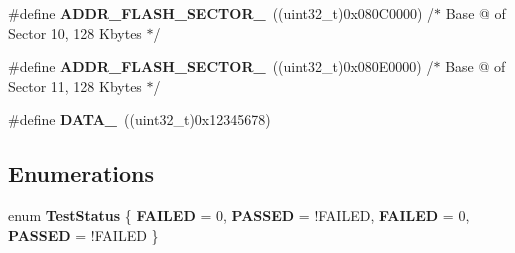 \begin{DoxyCompactItemize}
\item 
\hypertarget{group___f_l_a_s_h___program_ga3cea1f00ae802317e67815c9dedc62b7}{\#define {\bfseries A\-D\-D\-R\-\_\-\-F\-L\-A\-S\-H\-\_\-\-S\-E\-C\-T\-O\-R\-\_}~((uint32\-\_\-t)0x080\-C0000) /$\ast$ Base @ of Sector 10, 128 Kbytes $\ast$/}\label{group___f_l_a_s_h___program_ga3cea1f00ae802317e67815c9dedc62b7}

\item 
\hypertarget{group___f_l_a_s_h___program_ga7b945836a10e9782cbb63338f271f2aa}{\#define {\bfseries A\-D\-D\-R\-\_\-\-F\-L\-A\-S\-H\-\_\-\-S\-E\-C\-T\-O\-R\-\_}~((uint32\-\_\-t)0x080\-E0000) /$\ast$ Base @ of Sector 11, 128 Kbytes $\ast$/}\label{group___f_l_a_s_h___program_ga7b945836a10e9782cbb63338f271f2aa}

\item 
\hypertarget{group___f_l_a_s_h___program_ga10c5a379cdc06e8ace023d89206bae8d}{\#define {\bfseries D\-A\-T\-A\-\_}~((uint32\-\_\-t)0x12345678)}\label{group___f_l_a_s_h___program_ga10c5a379cdc06e8ace023d89206bae8d}

\end{DoxyCompactItemize}
\subsection*{Enumerations}
\begin{DoxyCompactItemize}
\item 
enum {\bfseries Test\-Status} \{ {\bfseries F\-A\-I\-L\-E\-D} = 0, 
{\bfseries P\-A\-S\-S\-E\-D} = !\-F\-A\-I\-L\-E\-D, 
{\bfseries F\-A\-I\-L\-E\-D} = 0, 
{\bfseries P\-A\-S\-S\-E\-D} = !\-F\-A\-I\-L\-E\-D
 \}
\end{DoxyCompactItemize}
